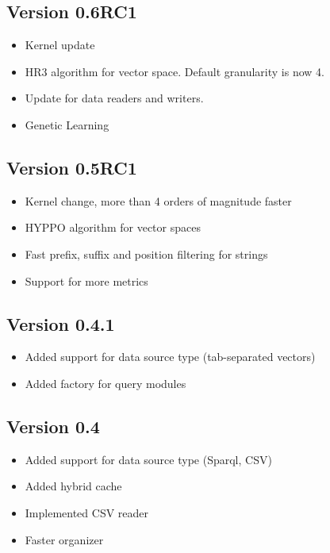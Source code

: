 \documentclass[a4paper, 11pt]{article}
\begin{document}
\subsection{Version 0.6RC1}
\begin{itemize}
\item Kernel update
\item HR3 algorithm for vector space. Default granularity is now 4.
\item Update for data readers and writers.
\item Genetic Learning
\end{itemize}

\subsection{Version 0.5RC1}
\begin{itemize}
\item Kernel change, more than 4 orders of magnitude faster
\item HYPPO algorithm for vector spaces
\item Fast prefix, suffix and position filtering for strings
\item Support for more metrics
\end{itemize}
\subsection{Version 0.4.1}
\begin{itemize}
\item Added support for data source type (tab-separated vectors)
\item Added factory for query modules
\end{itemize}

\subsection{Version 0.4}
\begin{itemize}
\item Added support for data source type (Sparql, CSV)
\item Added hybrid cache
\item Implemented CSV reader
\item Faster organizer
\end{itemize}
\end{document}
